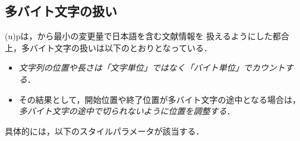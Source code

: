 \documentclass[a4paper,11pt,nomag,dvipdfmx]{jsarticle}
\def\pBibTeX{p\kern-.05em\BibTeX}
\def\pBibTeX{p\BibTeX}%
\begin{document}
\subsection{多バイト文字の扱い}

(u)\pBibTeX は，\BibTeX から最小の変更量で日本語を含む文献情報を
扱えるようにした都合上，多バイト文字の扱いは以下のとおりとなっている．
\begin{itemize}
 \item \emph{文字列の位置や長さは「文字単位」ではなく「バイト単位」でカウントする}．
 \item その結果として，開始位置や終了位置が多バイト文字の途中となる場合は，
   \emph{多バイト文字の途中で切られないように位置を調整する}．
\end{itemize}

具体的には，以下のスタイルパラメータが該当する．
\end{document}
